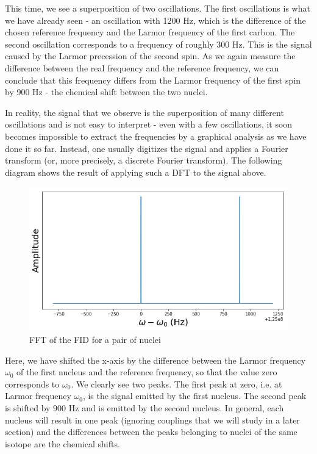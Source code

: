 \documentclass[a4paper, draft]{article}
\theoremstyle{own}
\theoremstyle{remark}
\begin{document}
This time, we see a superposition of two oscillations. The first oscillations is what we have already seen - an oscillation with 1200 Hz, which is the difference of the chosen reference frequency and the Larmor frequency of the first carbon. The second oscillation corresponds to a frequency of roughly 300 Hz. This is the signal caused by the Larmor precession of the second spin. As we again measure the difference between the real frequency and the reference frequency, we can conclude that this frequency differs from the Larmor frequency of the first spin by 900 Hz - the chemical shift between the two nuclei.

In reality, the signal that we observe is the superposition of many different oscillations and is not easy to interpret - even with a few oscillations, it soon becomes impossible to extract the frequencies by a graphical analysis as we have done it so far. Instead, one usually digitizes the signal and applies a Fourier transform (or, more precisely, a discrete Fourier transform). The following diagram shows the result of applying such a DFT to the signal above.

\begin{figure}[ht]
\centering
\includegraphics[width=0.9\linewidth]{images/TwoNucleiNMRSignalFFT}
\caption[FFT of the FID for a pair of nuclei]{FFT of the FID for a pair of nuclei}
\label{fig:TwoNucleiNMRSignalFFT}
\end{figure}

Here, we have shifted the x-axis by the difference between the Larmor frequency $\omega_0$ of the first nucleus and the reference frequency, so that the value zero corresponds to $\omega_0$. We clearly see two peaks. The first peak at zero, i.e. at Larmor frequency $\omega_0$, is the signal emitted by the first nucleus. The second peak is shifted by 900 Hz and is emitted by the second nucleus. In general, each nucleus will result in one peak (ignoring couplings that we will study in a later section) and the differences between the peaks belonging to nuclei of the same isotope are the chemical shifts. 
\end{document}

